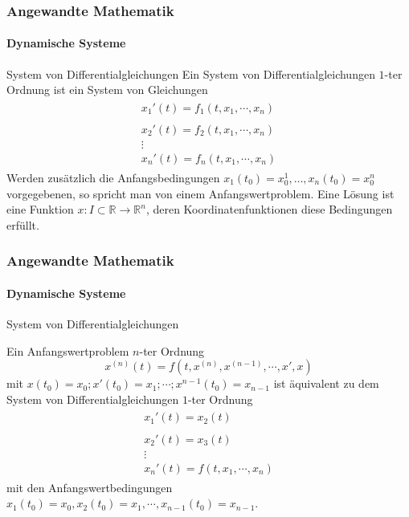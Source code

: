 \documentclass{beamer}
\begin{document}
\begin{frame}
    \frametitle{Angewandte Mathematik}
\framesubtitle{Dynamische Systeme }
\begin{block}{System von Differentialgleichungen}
Ein System von Differentialgleichungen $1$-ter Ordnung ist ein System von Gleichungen
\begin{align*}
\begin{matrix} x_1'(t) = f_1(t, x_1, \cdots, x_n ) \\  \\ x_2'(t) = f_2(t, x_1, \cdots, x_n ) \\  \vdots \\  x_n'(t) = f_n(t, x_1, \cdots, x_n )\end{matrix}
\end{align*}
Werden zusätzlich die Anfangsbedingungen $x_1(t_0)= x_0^1, \dots ,  x_n(t_0) = x_0^n$ vorgegebenen, so spricht man von einem Anfangswertproblem.
Eine Lösung ist eine Funktion $x : I \subset \mathbb{R} \to \mathbb{R}^n$, deren Koordinatenfunktionen diese Bedingungen erfüllt.
\end{block}
 \end{frame}

\begin{frame}
    \frametitle{Angewandte Mathematik}
\framesubtitle{Dynamische Systeme }
\begin{block}{System von Differentialgleichungen}

Ein Anfangswertproblem $n$-ter Ordnung
 $$ x^{(n)}(t) = f(t, x^{(n)}, x^{(n-1)} , \cdots , x', x) $$ mit  $x(t_0) = x_0 ; x'(t_0) = x_1; \cdots ; x^{n-1}(t_{0})= x_{n-1}  $ ist äquivalent zu dem System von   Differentialgleichungen $1$-ter Ordnung
\begin{align*}
\begin{matrix} x_1'(t) = x_2(t) \\  \\ x_2'(t) = x_3(t) \\  \vdots  \\ x_n'(t) = f(t, x_1, \cdots, x_n )\end{matrix}
\end{align*}
mit den Anfangswertbedingungen  $x_1(t_0) = x_0 , x_2(t_0) = x_1, \cdots , x_{n-1}(t_{0})= x_{n-1} $.
\end{block}


 \end{frame}
\end{document}
